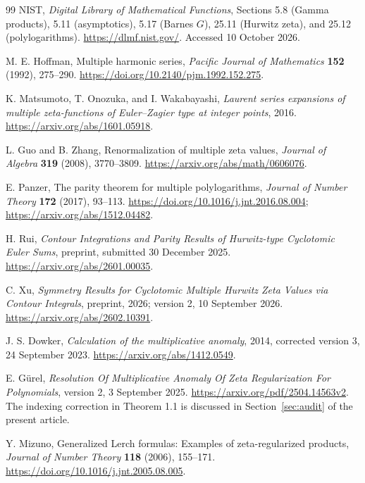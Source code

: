 \documentclass[11pt,letterpaper]{article}
\numberwithin{equation}{section}
\theoremstyle{plain}
\theoremstyle{definition}
\theoremstyle{remark}
\begin{document}
\begin{thebibliography}{99}
NIST, \emph{Digital Library of Mathematical Functions},
Sections 5.8 (Gamma products), 5.11 (asymptotics), 5.17 (Barnes $G$),
25.11 (Hurwitz zeta), and 25.12 (polylogarithms).
\url{https://dlmf.nist.gov/}. Accessed 10 October 2026.

M. E. Hoffman, Multiple harmonic series,
\emph{Pacific Journal of Mathematics} \textbf{152} (1992), 275--290.
\url{https://doi.org/10.2140/pjm.1992.152.275}.

K. Matsumoto, T. Onozuka, and I. Wakabayashi,
\emph{Laurent series expansions of multiple zeta-functions of
Euler--Zagier type at integer points}, 2016.
\url{https://arxiv.org/abs/1601.05918}.

L. Guo and B. Zhang, Renormalization of multiple zeta values,
\emph{Journal of Algebra} \textbf{319} (2008), 3770--3809.
\url{https://arxiv.org/abs/math/0606076}.

E. Panzer, The parity theorem for multiple polylogarithms,
\emph{Journal of Number Theory} \textbf{172} (2017), 93--113.
\url{https://doi.org/10.1016/j.jnt.2016.08.004};
\url{https://arxiv.org/abs/1512.04482}.

H. Rui, \emph{Contour Integrations and Parity Results of Hurwitz-type
Cyclotomic Euler Sums}, preprint, submitted 30 December 2025.
\url{https://arxiv.org/abs/2601.00035}.

C. Xu, \emph{Symmetry Results for Cyclotomic Multiple Hurwitz Zeta
Values via Contour Integrals}, preprint, 2026; version 2,
10 September 2026.
\url{https://arxiv.org/abs/2602.10391}.

J. S. Dowker, \emph{Calculation of the multiplicative anomaly},
2014, corrected version 3, 24 September 2023.
\url{https://arxiv.org/abs/1412.0549}.

E. G\"urel, \emph{Resolution Of Multiplicative Anomaly Of Zeta
Regularization For Polynomials}, version 2, 3 September 2025.
\url{https://arxiv.org/pdf/2504.14563v2}.
The indexing correction in Theorem 1.1 is discussed in
Section~\ref{sec:audit} of the present article.

Y. Mizuno, Generalized Lerch formulas: Examples of zeta-regularized
products, \emph{Journal of Number Theory} \textbf{118} (2006), 155--171.
\url{https://doi.org/10.1016/j.jnt.2005.08.005}.

\end{thebibliography}

\end{document}
